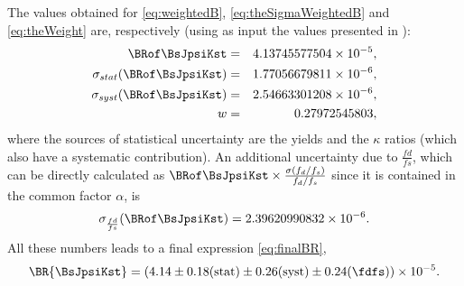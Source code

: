The values obtained for \eqref{eq:weightedB}, \eqref{eq:theSigmaWeightedB} and \eqref{eq:theWeight} are, respectively (using as input the values presented in ):
%
\begin{eqnarray}
\BRof\BsJpsiKst &=& 4.13745577504 \times 10^{-5}, \\
\sigma_{stat}(\BRof\BsJpsiKst) &=& 1.77056679811 \times 10^{-6}, \\
\sigma_{syst}(\BRof\BsJpsiKst) &=& 2.54663301208 \times 10^{-6}, \\
w &=& 0.27972545803,
\end{eqnarray}
%
where the sources of statistical uncertainty are the yields and the $\kappa$ ratios (which also have a systematic contribution). An additional uncertainty due to $\frac{fd}{fs}$, which can be directly calculated as $\BRof\BsJpsiKst\times\frac{\sigma(f_d/f_s)}{f_d/f_s}$ since it is contained in the common factor $\alpha$, is
%
\begin{equation}
\sigma_{\frac{fd}{fs}}(\BRof\BsJpsiKst) = 2.39620990832 \times 10^{-6}.
\end{equation}
All these numbers leads to a final expression \eqref{eq:finalBR},
\begin{equation}
\BR{\BsJpsiKst} = (4.14 \pm 0.18 \text{(stat)} \pm  0.26 \text{(syst)} \pm 0.24 (\fdfs))\times 10^{-5}.
\end{equation}
\clearpage

